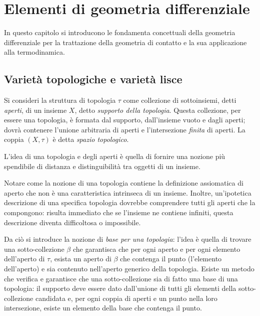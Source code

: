\chapter{Elementi di geometria differenziale}

In questo capitolo si introducono le fondamenta concettuali della geometria differenziale per la trattazione della geometria di contatto e la sua applicazione alla termodinamica.

\section{Varietà topologiche e varietà lisce}
Si consideri la struttura di topologia $\tau$ come collezione di sottoinsiemi, detti \emph{aperti}, di un insieme $X$, detto \emph{supporto della topologia}.
Questa collezione, per essere una topologia, è formata dal supporto, dall'insieme vuoto e dagli aperti; dovrà contenere l'unione arbitraria di aperti e l'intersezione \textit{finita} di aperti.
La coppia $(X, \tau)$ è detta \emph{spazio topologico}.

L'idea di una topologia e degli aperti è quella di fornire una nozione più spendibile di distanza e distinguibilità tra oggetti di un insieme.

Notare come la nozione di una topologia contiene la definizione assiomatica di aperto che non è una caratteristica intrinseca di un insieme.
Inoltre, un'ipotetica descrizione di una specifica topologia dovrebbe comprendere tutti gli aperti che la compongono: risulta immediato che se l'insieme ne contiene infiniti, questa descrizione diventa difficoltosa o impossibile.

Da ciò si introduce la nozione di \textit{base per una topologia}: l'idea è quella di trovare una sotto-collezione $\beta$ che garantisca che per ogni aperto e per ogni elemento dell'aperto di $\tau$, esista un aperto di $\beta$ che contenga il punto (l'elemento dell'aperto) e sia contenuto nell'aperto generico della topologia.
Esiste un metodo che verifica e garantisce che una sotto-collezione sia di fatto una base di una topologia: il supporto deve essere dato dall'unione di tutti gli elementi della sotto-collezione candidata e, per ogni coppia di aperti e un punto nella loro intersezione, esiste un elemento della base che contenga il punto.

